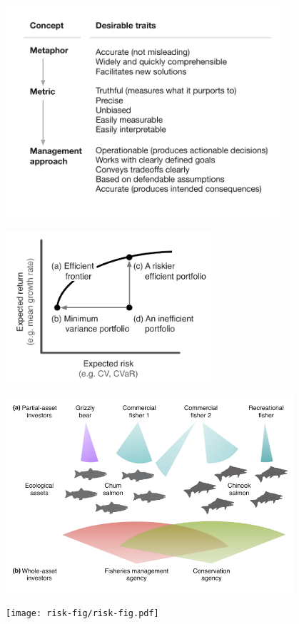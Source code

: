 \begin{figure}[htbp]
\centering
\includegraphics[width=4in]{mmm-traits.pdf}
\caption{}
\label{fig:traits}
\end{figure}

\clearpage

\begin{figure}[htbp]
\centering
\includegraphics[width=3in]{efficient-frontier-fig.pdf}
\caption{}
\label{fig:mpt}
\end{figure}

\clearpage

\begin{figure}[htbp]
\centering
\includegraphics[width=4.2in]{salmon-portfolios.pdf}
\caption{}
\label{fig:salmonport}
\end{figure}

\begin{figure}[htbp]
\centering
\texttt{[image: risk-fig/risk-fig.pdf]}
\caption{}
\label{fig:risk}
\end{figure}

